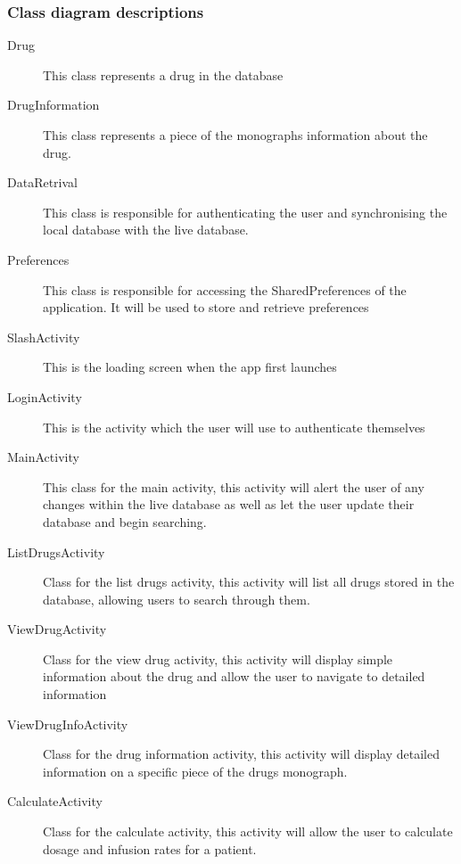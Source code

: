 \documentclass[11pt,fleqn,twoside]{article}
\begin{document}
\subsubsection{Class diagram descriptions}
\begin{description}
	\item[Drug] This class represents a drug in the database
	\item[DrugInformation] This class represents a piece of the monographs information about the drug.
	\item[DataRetrival] This class is responsible for authenticating the user and synchronising the local database with the live database.
	\item[Preferences] This class is responsible for accessing the SharedPreferences of the application. It will be used to store and retrieve preferences
	\item[SlashActivity] This is the loading screen when the app first launches
	\item[LoginActivity] This is the activity which the user will use to authenticate themselves
	\item[MainActivity] This class for the main activity, this activity will alert the user of any changes within the live database as well as let the user update their database and begin searching.
	\item[ListDrugsActivity] Class for the list drugs activity, this activity will list all drugs stored in the database, allowing users to search through them.
	\item[ViewDrugActivity] Class for the view drug activity, this activity will display simple information about the drug and allow the user to navigate to detailed information
	\item[ViewDrugInfoActivity] Class for the drug information activity, this activity will display detailed information on a specific piece of the drugs monograph.
	\item[CalculateActivity] Class for the calculate activity, this activity will allow the user to calculate dosage and infusion rates for a patient.

\end{description}
\end{document}

